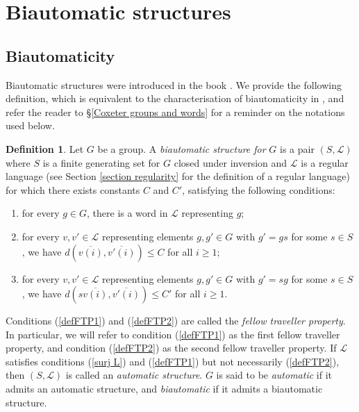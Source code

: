 \documentclass[a4paper,12pt,leqno]{amsart}
\theoremstyle{definition}
\newtheorem{defin}[theorem]{Definition}
\newcommand{\LL}{\mathcal{L}}
\begin{document}
\section{Biautomatic structures} \label{section Biau}

\subsection{Biautomaticity}

Biautomatic structures were introduced in the book \cite{wordprocessing}. We provide the following definition, which is equivalent to the characterisation of biautomaticity in \cite[Lem 2.5.5]{wordprocessing}, and refer the reader to \S\ref{Coxeter groups and words} for a reminder on the notations used below. 

\begin{defin}
    Let $G$ be a group. A \emph{biautomatic structure for} $G$ is a pair $(S,\LL)$ where $S$ is a finite generating set for $G$ closed under inversion and $\LL$ is a regular language (see Section \ref{section regularity} for the definition of a regular language) for which there exists constants $C$ and $C'$, satisfying the following conditions:
    \begin{enumerate}
        \item \label{surj L} for every $g \in G$, there is a word in $\LL$ representing $g$;
        \item \label{defFTP1} for every $v,v' \in \LL$ representing elements $g, g' \in G$ with $g'=gs$ for some $s \in S$, we have $d(\overline{v(i)},\overline{v'(i)}) \leq C$ for all $i\geq 1$;
        \item \label{defFTP2} for every $v,v' \in \LL$ representing elements $g, g' \in G$ with $g'=sg$ for some $s \in S$, we have $d(s\overline{v(i)},\overline{v'(i)}) \leq C'$ for all $i\geq 1$.
    \end{enumerate}
    Conditions (\ref{defFTP1}) and (\ref{defFTP2}) are called the \emph{fellow traveller property}. In particular, we will refer to condition (\ref{defFTP1}) as the first fellow traveller property, and condition (\ref{defFTP2}) as the second fellow traveller property. If $\LL$ satisfies conditions (\ref{surj L}) and (\ref{defFTP1}) but not necessarily (\ref{defFTP2}), then $(S,\LL)$ is called an \emph{automatic structure}. $G$ is said to be \emph{automatic} if it admits an automatic structure, and \emph{biautomatic} if it admits a biautomatic structure.
\end{defin}
\end{document}
